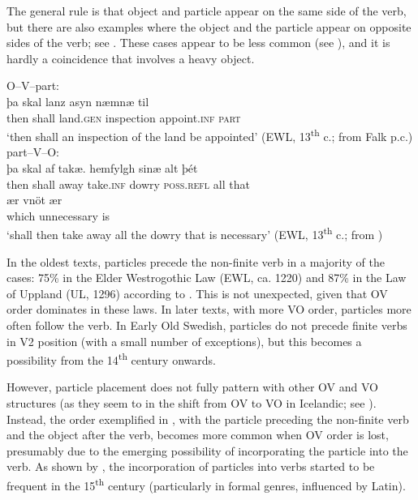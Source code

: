 \documentclass[output=paper]{langscibook}
\begin{document}
The general rule is that object and particle appear on the same side of the verb, but there are also examples where the object and the particle appear on opposite sides of the verb; see . These cases appear to be less common (see \citealt{Ljunggren1932}), and it is hardly a coincidence that  involves a heavy object.


\ea\label{ex:lalu:22}
\ea\label{ex:lalu:22a} O--V–part:  \\
\gll þa     skal   lanz       asyn       næmnæ       til\\
    then   shall   land.\textsc{gen}   inspection   appoint.\textsc{inf}   \textsc{part} \\
\glt `then shall an inspection of the land be appointed’ (EWL, 13\textsuperscript{th} c.; from Falk p.c.)\\

\ex \label{ex:lalu:22b}part–V–O:     \\
\gll þa     skal   af  takæ.   hemfylgh   sinæ       alt   þét \\
    then   shall   away  take.\textsc{inf}  dowry     \textsc{poss.refl}   all   that \\

\gll ær       vnöt         ær\\
    which   unnecessary   is \\
\glt `shall then take away all the dowry that is necessary’ (EWL, 13\textsuperscript{th} c.; from \citealt{Ljunggren1932})\\
\z
\z



In the oldest texts, particles precede the non-finite verb in a majority of the cases: 75\% in the Elder Westrogothic Law (EWL, ca. 1220) and 87\% in the Law of Uppland (UL, 1296) according to \citet[95]{Ljunggren1932}. This is not unexpected, given that OV order dominates in these laws. In later texts, with more VO order, particles more often follow the verb. In Early Old Swedish, particles do not precede finite verbs in V2 position (with a small number of exceptions), but this becomes a possibility from the 14\textsuperscript{th} century onwards. 



However, particle placement does not fully pattern with other OV and VO structures (as they seem to in the shift from OV to VO in Icelandic; see \citealt{Hroarsdottir2008}). Instead, the order exemplified in , with the particle preceding the non-finite verb and the object after the verb, becomes more common when OV order is lost, presumably due to the emerging possibility of incorporating the particle into the verb. As shown by \citet{Ljunggren1932,Ljunggren1937}, the incorporation of particles into verbs started to be frequent in the 15\textsuperscript{th} century (particularly in formal genres, influenced by Latin).
\end{document}
